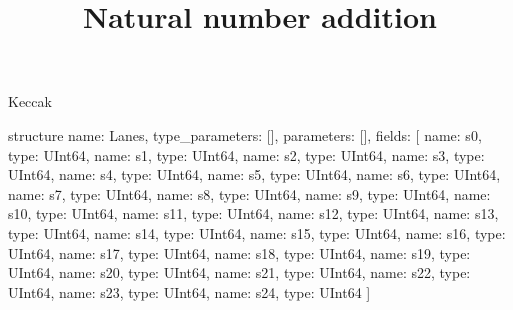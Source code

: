 \begin{lexlean}{Keccak}
\title{Natural number addition}
\begin{semanticmodule}
structure{
  name: Lanes,
  type_parameters: [],
  parameters: [],
  fields: [
    {name: s0, type: UInt64},
    {name: s1, type: UInt64},
    {name: s2, type: UInt64},
    {name: s3, type: UInt64},
    {name: s4, type: UInt64},
    {name: s5, type: UInt64},
    {name: s6, type: UInt64},
    {name: s7, type: UInt64},
    {name: s8, type: UInt64},
    {name: s9, type: UInt64},
    {name: s10, type: UInt64},
    {name: s11, type: UInt64},
    {name: s12, type: UInt64},
    {name: s13, type: UInt64},
    {name: s14, type: UInt64},
    {name: s15, type: UInt64},
    {name: s16, type: UInt64},
    {name: s17, type: UInt64},
    {name: s18, type: UInt64},
    {name: s19, type: UInt64},
    {name: s20, type: UInt64},
    {name: s21, type: UInt64},
    {name: s22, type: UInt64},
    {name: s23, type: UInt64},
    {name: s24, type: UInt64}
  ]
}


\end{semanticmodule}
\end{lexlean}
